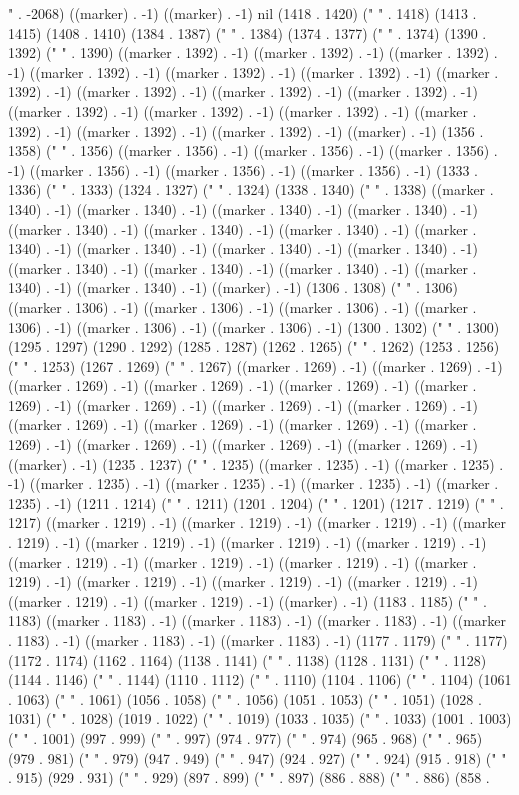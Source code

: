 " . -2068) ((marker) . -1) ((marker) . -1) nil (1418 . 1420) (" " . 1418) (1413 . 1415) (1408 . 1410) (1384 . 1387) ("  " . 1384) (1374 . 1377) ("  " . 1374) (1390 . 1392) (" " . 1390) ((marker . 1392) . -1) ((marker . 1392) . -1) ((marker . 1392) . -1) ((marker . 1392) . -1) ((marker . 1392) . -1) ((marker . 1392) . -1) ((marker . 1392) . -1) ((marker . 1392) . -1) ((marker . 1392) . -1) ((marker . 1392) . -1) ((marker . 1392) . -1) ((marker . 1392) . -1) ((marker . 1392) . -1) ((marker . 1392) . -1) ((marker . 1392) . -1) ((marker . 1392) . -1) ((marker) . -1) (1356 . 1358) (" " . 1356) ((marker . 1356) . -1) ((marker . 1356) . -1) ((marker . 1356) . -1) ((marker . 1356) . -1) ((marker . 1356) . -1) ((marker . 1356) . -1) (1333 . 1336) ("  " . 1333) (1324 . 1327) ("  " . 1324) (1338 . 1340) (" " . 1338) ((marker . 1340) . -1) ((marker . 1340) . -1) ((marker . 1340) . -1) ((marker . 1340) . -1) ((marker . 1340) . -1) ((marker . 1340) . -1) ((marker . 1340) . -1) ((marker . 1340) . -1) ((marker . 1340) . -1) ((marker . 1340) . -1) ((marker . 1340) . -1) ((marker . 1340) . -1) ((marker . 1340) . -1) ((marker . 1340) . -1) ((marker . 1340) . -1) ((marker . 1340) . -1) ((marker) . -1) (1306 . 1308) (" " . 1306) ((marker . 1306) . -1) ((marker . 1306) . -1) ((marker . 1306) . -1) ((marker . 1306) . -1) ((marker . 1306) . -1) ((marker . 1306) . -1) (1300 . 1302) (" " . 1300) (1295 . 1297) (1290 . 1292) (1285 . 1287) (1262 . 1265) ("  " . 1262) (1253 . 1256) ("  " . 1253) (1267 . 1269) (" " . 1267) ((marker . 1269) . -1) ((marker . 1269) . -1) ((marker . 1269) . -1) ((marker . 1269) . -1) ((marker . 1269) . -1) ((marker . 1269) . -1) ((marker . 1269) . -1) ((marker . 1269) . -1) ((marker . 1269) . -1) ((marker . 1269) . -1) ((marker . 1269) . -1) ((marker . 1269) . -1) ((marker . 1269) . -1) ((marker . 1269) . -1) ((marker . 1269) . -1) ((marker . 1269) . -1) ((marker) . -1) (1235 . 1237) (" " . 1235) ((marker . 1235) . -1) ((marker . 1235) . -1) ((marker . 1235) . -1) ((marker . 1235) . -1) ((marker . 1235) . -1) ((marker . 1235) . -1) (1211 . 1214) ("  " . 1211) (1201 . 1204) ("  " . 1201) (1217 . 1219) (" " . 1217) ((marker . 1219) . -1) ((marker . 1219) . -1) ((marker . 1219) . -1) ((marker . 1219) . -1) ((marker . 1219) . -1) ((marker . 1219) . -1) ((marker . 1219) . -1) ((marker . 1219) . -1) ((marker . 1219) . -1) ((marker . 1219) . -1) ((marker . 1219) . -1) ((marker . 1219) . -1) ((marker . 1219) . -1) ((marker . 1219) . -1) ((marker . 1219) . -1) ((marker . 1219) . -1) ((marker) . -1) (1183 . 1185) (" " . 1183) ((marker . 1183) . -1) ((marker . 1183) . -1) ((marker . 1183) . -1) ((marker . 1183) . -1) ((marker . 1183) . -1) ((marker . 1183) . -1) (1177 . 1179) (" " . 1177) (1172 . 1174) (1162 . 1164) (1138 . 1141) ("  " . 1138) (1128 . 1131) ("  " . 1128) (1144 . 1146) (" " . 1144) (1110 . 1112) (" " . 1110) (1104 . 1106) (" " . 1104) (1061 . 1063) (" " . 1061) (1056 . 1058) (" " . 1056) (1051 . 1053) (" " . 1051) (1028 . 1031) ("  " . 1028) (1019 . 1022) ("  " . 1019) (1033 . 1035) (" " . 1033) (1001 . 1003) (" " . 1001) (997 . 999) (" " . 997) (974 . 977) ("  " . 974) (965 . 968) ("  " . 965) (979 . 981) (" " . 979) (947 . 949) (" " . 947) (924 . 927) ("  " . 924) (915 . 918) ("  " . 915) (929 . 931) (" " . 929) (897 . 899) (" " . 897) (886 . 888) (" " . 886) (858 . 